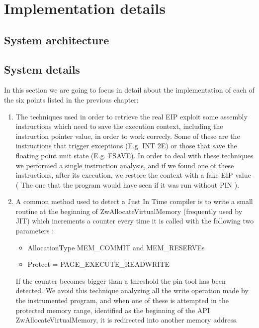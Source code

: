\chapter{Implementation details}
\label{chapter4}
\thispagestyle{empty}

\section{System architecture}

\section{System details}
In this section we are going to focus in detail about the implementation of each of the six points listed in the previous chapter:
\begin{enumerate}

\item The techniques used in order to retrieve the real EIP exploit some assembly instructions which need to save the execution context, including the instruction pointer value, in order to work correcly. Some of these are the instructions that trigger exceptions (E.g. INT 2E) or those that save the floating point unit state (E.g. FSAVE). In order to deal with these techniques we performed a single instruction analysis, and if we found one of these instructions, after its execution, we restore the context with a fake EIP value ( The one that the program would have seen if it was run without PIN ).

\item A common method used to detect a Just In Time compiler is to write a small routine at the beginning of ZwAllocateVirtualMemory (frequently used by JIT) which increments a counter every time it is called with the following two parameters : 

\begin{itemize}
\item AllocationType MEM\_COMMIT and MEM\_RESERVEs

\item Protect = PAGE\_EXECUTE\_READWRITE
\end{itemize}

If the counter becomes bigger than a threshold the pin tool has been detected. We avoid this technique analyzing all the write operation made by the instrumented program, and when one of these is attempted in the protected memory range, identified as the beginning of the API ZwAllocateVirtualMemory, it is redirected into another memory address.


\end{enumerate}
